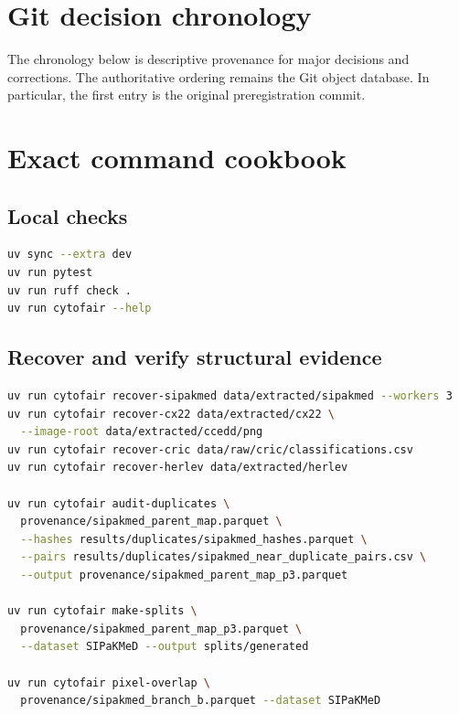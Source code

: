 \documentclass[11pt,oneside]{report}
\begin{document}
{\scriptsize
\setlength{\tabcolsep}{3pt}

}

\chapter{Git decision chronology}

The chronology below is descriptive provenance for major decisions and corrections. The authoritative ordering remains the Git object database. In particular, the first entry is the original preregistration commit.

{\scriptsize
\setlength{\tabcolsep}{3pt}

}

\chapter{Exact command cookbook}

\section{Local checks}

\begin{lstlisting}[style=cyto,language=bash]
uv sync --extra dev
uv run pytest
uv run ruff check .
uv run cytofair --help
\end{lstlisting}

\section{Recover and verify structural evidence}

\begin{lstlisting}[style=cyto,language=bash]
uv run cytofair recover-sipakmed data/extracted/sipakmed --workers 3
uv run cytofair recover-cx22 data/extracted/cx22 \
  --image-root data/extracted/ccedd/png
uv run cytofair recover-cric data/raw/cric/classifications.csv
uv run cytofair recover-herlev data/extracted/herlev

uv run cytofair audit-duplicates \
  provenance/sipakmed_parent_map.parquet \
  --hashes results/duplicates/sipakmed_hashes.parquet \
  --pairs results/duplicates/sipakmed_near_duplicate_pairs.csv \
  --output provenance/sipakmed_parent_map_p3.parquet

uv run cytofair make-splits \
  provenance/sipakmed_parent_map_p3.parquet \
  --dataset SIPaKMeD --output splits/generated

uv run cytofair pixel-overlap \
  provenance/sipakmed_branch_b.parquet --dataset SIPaKMeD
\end{lstlisting}
\end{document}
